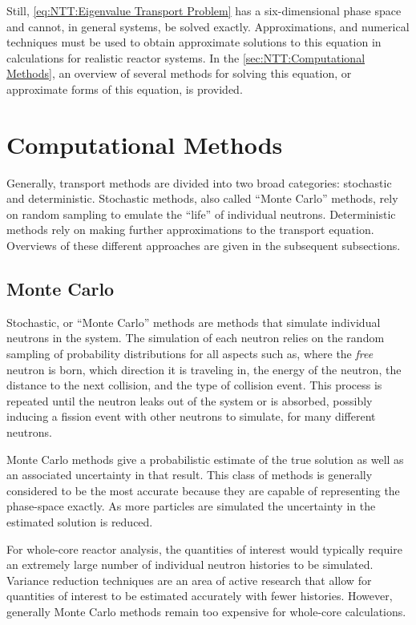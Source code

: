 {{        Still, \cref{eq:NTT:Eigenvalue Transport Problem} has a six-dimensional phase space and cannot, in general systems, be solved exactly.
        Approximations, and numerical techniques must be used to obtain approximate solutions to this equation in calculations for realistic reactor systems.
        In the \cref{sec:NTT:Computational Methods}, an overview of several methods for solving this equation, or approximate forms of this equation, is provided.
    }
    \section{Computational Methods}{\label{sec:NTT:Computational Methods}
        Generally, transport methods are divided into two broad categories: stochastic and deterministic.
        Stochastic methods, also called ``Monte Carlo'' methods, rely on random sampling to emulate the ``life'' of individual neutrons.
        Deterministic methods rely on making further approximations to the transport equation.
        Overviews of these different approaches are given in the subsequent subsections.

        \subsection{Monte Carlo}{\label{ssec:NTT:Monte Carlo}
            Stochastic, or ``Monte Carlo'' methods are methods that simulate individual neutrons in the system.
            The simulation of each neutron relies on the random sampling of probability distributions for all aspects such as, where the \emph{free} neutron is born, which direction it is traveling in, the energy of the neutron, the distance to the next collision, and the type of collision event.
            This process is repeated until the neutron leaks out of the system or is absorbed, possibly inducing a fission event with other neutrons to simulate, for many different neutrons.

            Monte Carlo methods give a probabilistic estimate of the true solution as well as an associated uncertainty in that result.
            This class of methods is generally considered to be the most accurate because they are capable of representing the phase-space exactly.
            As more particles are simulated the uncertainty in the estimated solution is reduced.

            For whole-core reactor analysis, the quantities of interest would typically require an extremely large number of individual neutron histories to be simulated.
            Variance reduction techniques are an area of active research that allow for quantities of interest to be estimated accurately with fewer histories. %
            However, generally Monte Carlo methods remain too expensive for whole-core calculations.
        }
}}
